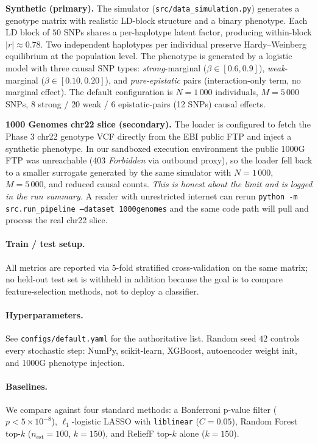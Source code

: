 \documentclass[11pt,a4paper]{article}
\begin{document}
\textbf{Synthetic (primary).} The simulator (\texttt{src/data\_simulation.py})
generates a genotype matrix with realistic LD-block structure and a
binary phenotype. Each LD block of $50$ SNPs shares a per-haplotype
latent factor, producing within-block $|r| \approx 0.78$. Two
independent haplotypes per individual preserve Hardy--Weinberg
equilibrium at the population level. The phenotype is generated by a
logistic model with three causal SNP types: \emph{strong}-marginal
($\beta \in [0.6, 0.9]$), \emph{weak}-marginal ($\beta \in [0.10, 0.20]$),
and \emph{pure-epistatic} pairs (interaction-only term, no marginal
effect). The default configuration is $N = 1\,000$ individuals,
$M = 5\,000$ SNPs, $8$ strong / $20$ weak / $6$ epistatic-pairs (12 SNPs)
causal effects.

\textbf{1000 Genomes chr22 slice (secondary).} The loader is
configured to fetch the Phase 3 chr22 genotype VCF directly from the
EBI public FTP and inject a synthetic phenotype. In our sandboxed
execution environment the public 1000G FTP was unreachable
(403 \emph{Forbidden} via outbound proxy), so the loader
fell back to a smaller surrogate generated by the same simulator with
$N=1\,000$, $M=5\,000$, and reduced causal counts. \emph{This is honest
about the limit and is logged in the run summary.} A reader with
unrestricted internet can rerun \texttt{python -m src.run\_pipeline
--dataset 1000genomes} and the same code path will pull and process
the real chr22 slice.

\paragraph{Train / test setup.} All metrics are reported via $5$-fold
stratified cross-validation on the same matrix; no held-out test set is
withheld in addition because the goal is to compare feature-selection
methods, not to deploy a classifier.

\paragraph{Hyperparameters.} See \texttt{configs/default.yaml} for the
authoritative list. Random seed $42$ controls every stochastic step:
NumPy, scikit-learn, XGBoost, autoencoder weight init, and 1000G
phenotype injection.

\paragraph{Baselines.} We compare against four standard methods: a
Bonferroni p-value filter ($p < 5 \times 10^{-8}$), $\ell_1$-logistic
LASSO with \texttt{liblinear} ($C = 0.05$), Random Forest top-$k$
($n_{\text{est}}=100$, $k=150$), and ReliefF top-$k$ alone ($k=150$).
\end{document}
